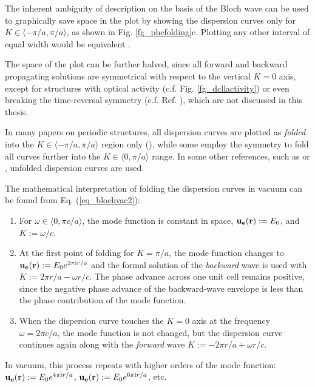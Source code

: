 \label{par_disp_curv_per}
The inherent ambiguity of description on the basis of the Bloch wave can be used to graphically save space in the plot by showing the dispersion curves only for $K\in\langle-\pi/a, \pi/a\rangle$, as shown in Fig. \ref{fg_phcfolding}c. Plotting any other interval of equal width would be equivalent \cite[p. 177]{brillouin2003wave}. 

The space of the plot can be further halved, since all forward and backward propagating solutions are symmetrical with respect to the vertical $K=0$ axis, except for structures with optical activity (c.f. Fig. \ref{fg_dcllactivity}) or even breaking the time-reversal symmetry (c.f. Ref. \cite{vanwolleghem2009unidirectional}), which are not discussed in this thesis. 

In many papers on periodic structures, all dispersion curves are plotted as \textit{folded} into the $K\in\langle -\pi/a, \pi/a\rangle$ region only (\cite{obrien2002photonic, yannopapas2005negative, chakrabarti2001magnetic}), while some employ the symmetry to fold  all curves further into the $K\in\langle0, \pi/a\rangle$ range. %
In some other references, such as \cite{mortensen2010unambiguous} or \cite{yeh1977electromagnetic}, unfolded dispersion curves are used.

The mathematical interpretation of folding the dispersion curves in vacuum can be found from Eq. (\ref{eq_blochvac2}): 
\begin{enumerate}
\item{
For  $\omega\in\langle 0, \pi c /a\rangle$, the mode function is constant in space, $\mathbf{u_e}({\mathbf{r}}) := E_0$, and $K := \omega/c$. 
} 
\item{
At the first point of folding for $K=\pi/a$, the mode function changes to $\mathbf{u_e}({\mathbf{r}}) := E_0 e^{2\pi{\mathrm i} r/a}$ and the formal solution of the \textit{backward} wave is used with $K := 2\pi r/a - \omega r/c$.  The phase advance across one unit cell remains positive, since the negative phase advance of the backward-wave envelope is less than the phase contribution of the mode function.
} 
\item{
When the dispersion curve touches the $K=0$ axis at the frequency $\omega = 2\pi c/a$, the mode function is not changed, but the dispersion curve continues again along with the \textit{forward} wave $K := - 2\pi r/a + \omega r/c$. 
} 
 \end{enumerate}
In vacuum, this process repeats with higher orders of the mode function: $\mathbf{u_e}({\mathbf{r}}) := E_0 e^{4\pi{\mathrm i} r/a}$, $\mathbf{u_e}({\mathbf{r}}) := E_0 e^{6\pi{\mathrm i} r/a}$, etc.

